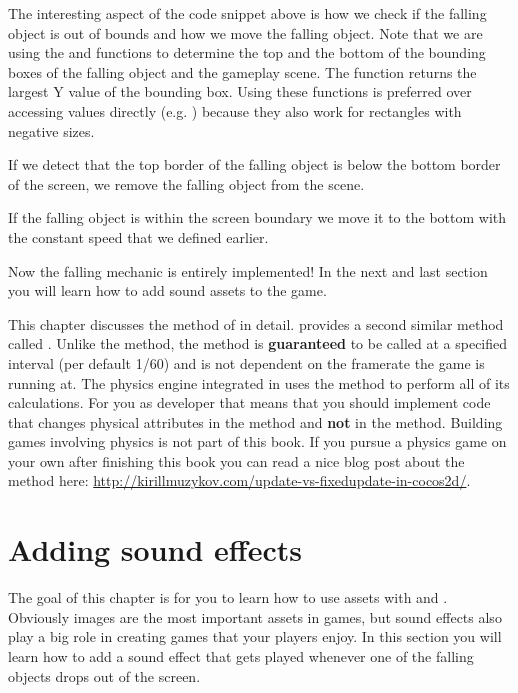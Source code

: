 The interesting aspect of the code snippet above is how we check if the
falling object is out of bounds and how we move the falling object. Note that we
are using the  and 
functions to determine the top and the bottom of the bounding boxes of the
falling object and the gameplay scene. The  function
returns the largest Y value of the bounding box. Using these functions is preferred over accessing values
directly (e.g. ) because they
also work for rectangles with negative sizes.

If we detect that the top border of the falling object is below the bottom
border of the screen, we remove the falling object from the scene.

If the falling object is within the screen boundary we move it to the bottom
with the constant speed that we defined earlier.

Now the falling mechanic is entirely implemented! In the next and last
section you will learn how to add sound assets to the game.

\begin{details}[frametitle={Update vs. Fixed Update}] 
This chapter discusses the  method of \cocos{} in detail.
\cocos{} provides a second similar method called
.
Unlike the  method, the  method is
\textbf{guaranteed} to be called at a specified interval (per default 1/60) and
is not dependent on the framerate the game is running at. The physics engine
integrated in \cocos{} uses the
 method to perform all of its calculations. For you as
developer that means that you should implement code that changes physical
attributes in the  method and \textbf{not} in the
 method. Building games involving physics is not part of
this book. If you pursue a physics game on your own after finishing this book
you can read a nice blog post about the  method here:
\url{http://kirillmuzykov.com/update-vs-fixedupdate-in-cocos2d/}.
\end{details}

\section{Adding sound effects}
The goal of this chapter is for you to learn how to use assets with \SB{} and
\cocos{}. Obviously images are the most important assets in games, but sound
effects also play a big role in creating games that your players enjoy. In this
section you will learn how to add a sound effect that gets played whenever one
of the falling objects drops out of the screen.

